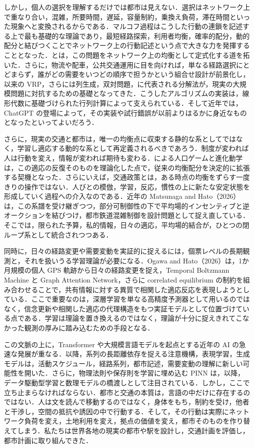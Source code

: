 しかし，個人の選択を理解するだけでは都市は見えない．選択はネットワーク上で重なり合い，混雑，所要時間，遅延，容量制約，乗換え負荷，滞在時間といった現象へと変換されるからである．マルコフ過程はこうした行動の連鎖を記述する上で最も基礎的な理論であり，最短経路探索，利用者均衡，確率的配分，動的配分と結びつくことでネットワーク上の行動記述という点で大きな力を発揮することとなった．\citet{Wardrop1952}と\citet{Beckmann1956}は，この問題をネットワーク上の均衡として定式化する道を拓いた．さらに，物流や配車，公共交通運用に目を向ければ，単なる経路選択にとどまらず，誰がどの需要をいつどの順序で担うかという組合せ設計が前景化し，\citet{DantzigRamser1959}以来の VRP，さらには列生成，双対問題，\citet{Benders1962}に代表される分解法が，現実の大規模問題に対抗するための基礎となってきた．こうしたアルゴリズムの実装は，線形代数に基礎づけられた行列計算によって支えられている．そして近年では，ChatGPT の登場によって，その実装や試行錯誤が以前よりはるかに身近なものとなったといってよいだろう．

さらに，現実の交通と都市は，唯一の均衡点に収束する静的な系としてではなく，学習し適応する動的な系として再定義されるべきであろう．制度が変われば人は行動を変え，情報が変われば期待も変わる．\citet{Sandholm2002,Sandholm2010}による人口ゲームと進化動学は，この適応の反復そのものを理論化した点で，従来の均衡配分を決定的に拡張する契機となった．さらにいえば，交通政策とは，ある時点の均衡をずらす一度きりの操作ではない．人びとの模倣，学習，反応，慣性の上に新たな安定状態を形成していく過程への介入なのである．近年の Matsunaga and Hato（2026）は，この系譜を受け継ぎつつ，部分可制御性の下で平均場的インセンティブと逆オークションを結びつけ，都市鉄道混雑制御を設計問題として捉え直している．そこでは，限られた予算，私的情報，日々の適応，平均場的結合が，ひとつの閉ループ系として統合されつつある．

同時に，日々の経路変更や需要変動を実証的に捉えるには，個票レベルの長期観測と，それを扱いうる学習理論が必要になる．Ogawa and Hato（2026）は，1か月規模の個人 GPS 軌跡から日々の経路変更を捉え，Temporal Boltzmann Machine と Graph Attention Network，さらに correlated equilibrium の制約を組み合わせることで，共有情報に対する異質で相関した適応反応を表現しようとしている．ここで重要なのは，深層学習を単なる高精度予測器として用いるのではなく，信念更新や相関した適応の代理構造をもつ実証モデルとして位置づけている点である．学習は理論を置き換えるのではなく，理論が十分に捉えきれてこなかった観測の厚みに踏み込むための手段となる．

この文脈の上に，Transformer や大規模言語モデルを起点とする近年の AI の急速な発展が重なる．\citet{Vaswani2017}以降，系列の長距離依存を捉える注意機構，表現学習，生成モデルは，活動スケジュール，経路系列，都市記述，需要変動の理解に新しい可能性を開いた．さらに，物理法則や保存則を学習に埋め込む PINN は，\citet{Raissi2019}以降，データ駆動型学習と数理モデルの橋渡しとして注目されている．しかし，ここで立ち止まらなければならない．都市と交通の本質は，言語の中だけに存在するのではない．人は文を読んで移動するのではなく，身体をもち，制約を受け，他者と干渉し，空間の抵抗や誘因の中で行動する．そして，その行動は実際にネットワーク負荷を変え，土地利用を変え，拠点の価値を変え，都市そのものを作り替えてしまう．私たちは世界各地の現実の都市や駅を設計し，交通計画を評価し，都市計画に取り組んできた．

